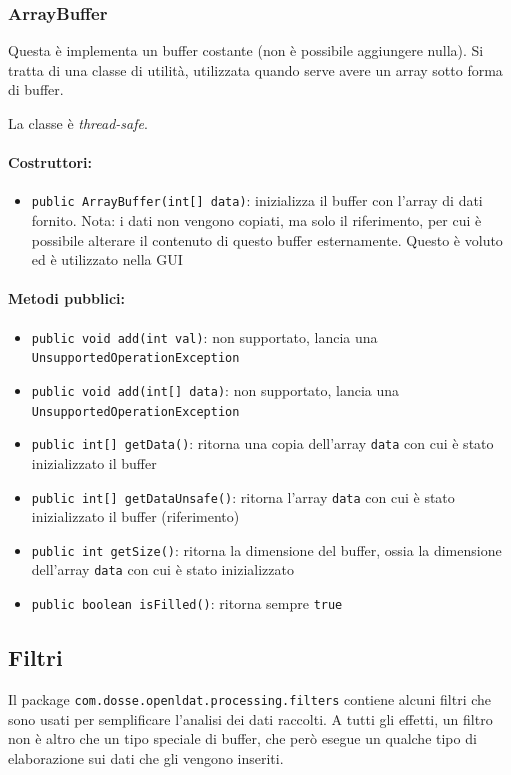 \subsubsection{ArrayBuffer}
Questa è implementa un buffer costante (non è possibile aggiungere nulla). Si tratta di una classe di utilità, utilizzata quando serve avere un array sotto forma di buffer.

La classe è \textit{thread-safe}.

\paragraph{Costruttori:}\begin{itemize}
	\item \texttt{public ArrayBuffer(int[] data)}: inizializza il buffer con l'array di dati fornito. Nota: i dati non vengono copiati, ma solo il riferimento, per cui è possibile alterare il contenuto di questo buffer esternamente. Questo è voluto ed è utilizzato nella GUI
\end{itemize}

\paragraph{Metodi pubblici:}\begin{itemize}
	\item \texttt{public void add(int val)}: non supportato, lancia una \texttt{UnsupportedOperationException}
	\item \texttt{public void add(int[] data)}: non supportato, lancia una \texttt{UnsupportedOperationException}
	\item \texttt{public int[] getData()}: ritorna una copia dell'array \texttt{data} con cui è stato inizializzato il buffer
	\item \texttt{public int[] getDataUnsafe()}: ritorna l'array \texttt{data} con cui è stato inizializzato il buffer (riferimento)
	\item \texttt{public int getSize()}: ritorna la dimensione del buffer, ossia la dimensione dell'array \texttt{data} con cui è stato inizializzato
	\item \texttt{public boolean isFilled()}: ritorna sempre \texttt{true}
\end{itemize}

\subsection{Filtri}
Il package \texttt{com.dosse.openldat.processing.filters} contiene alcuni filtri che sono usati per semplificare l'analisi dei dati raccolti. A tutti gli effetti, un filtro non è altro che un tipo speciale di buffer, che però esegue un qualche tipo di elaborazione sui dati che gli vengono inseriti.

